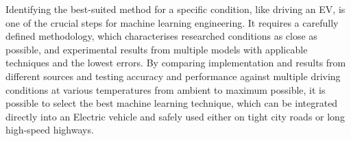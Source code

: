 %
Identifying the best-suited method for a specific condition, like driving an EV, is one of the crucial steps for machine learning engineering.
It requires a carefully defined methodology, which characterises researched conditions as close as possible, and experimental results from multiple models with applicable techniques and the lowest errors.
By comparing implementation and results from different sources and testing accuracy and performance against multiple driving conditions at various temperatures from ambient to maximum possible, it is possible to select the best machine learning technique, which can be integrated directly into an Electric vehicle and safely used either on tight city roads or long high-speed highways.
%
